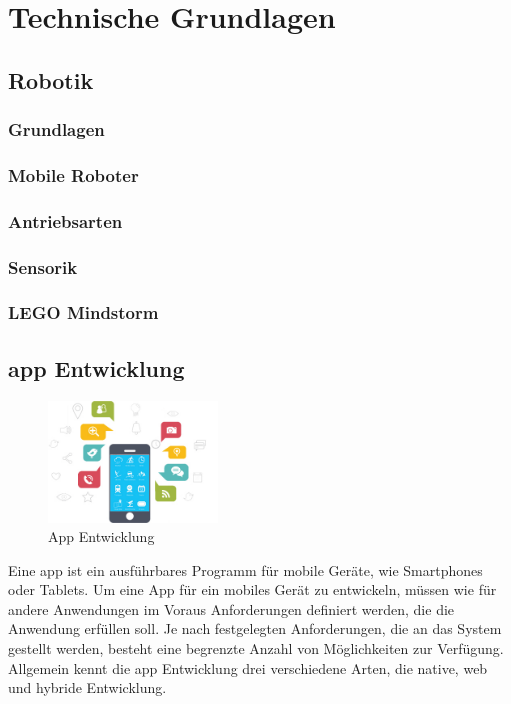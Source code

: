 \section{Technische Grundlagen}
\subsection{Robotik} %

\subsubsection{Grundlagen}
\subsubsection{Mobile Roboter}
\subsubsection{Antriebsarten}
\subsubsection{Sensorik}
\subsubsection{LEGO Mindstorm}

\newpage
\subsection{\gls{app} Entwicklung} %

\begin{figure}
	\begin{center}
		\includegraphics[width=0.4\textwidth]{images/technische_grundlagen/App-Development.jpg}
	\end{center}
	\caption{App Entwicklung}
	\label{fig:appentwicklung}
\end{figure}

Eine \gls{app} ist ein ausführbares Programm für mobile Geräte, wie Smartphones oder Tablets. Um eine App für ein mobiles Gerät zu entwickeln, müssen wie für andere Anwendungen im Voraus Anforderungen definiert werden, die die Anwendung erfüllen soll. Je nach festgelegten Anforderungen, die an das System gestellt werden, besteht eine begrenzte Anzahl von Möglichkeiten zur Verfügung. Allgemein kennt die \gls{app} Entwicklung drei verschiedene Arten, die native, web und hybride Entwicklung.

